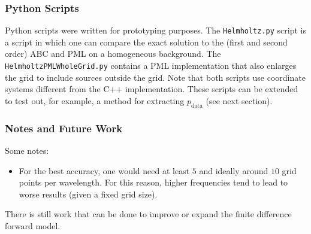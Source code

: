 \documentclass[10pt,a4paper]{article}
\begin{document}
\subsubsection{Python Scripts}
Python scripts were written for prototyping purposes. The \texttt{Helmholtz.py} script is a script in which one can compare the exact solution to the (first and second order) ABC and PML on a homogeneous background. The \texttt{HelmholtzPMLWholeGrid.py} contains a PML implementation that also enlarges the grid to include sources outside the grid. Note that both scripts use coordinate systems different from the C++ implementation. These scripts can be extended to test out, for example, a method for extracting $p_{\text{data}}$ (see next section). 

\subsubsection{Notes and Future Work}
Some notes:

\begin{itemize}
	\item For the best accuracy, one would need at least $5$ and ideally around $10$ grid points per wavelength. For this reason, higher frequencies tend to lead to worse results (given a fixed grid size).
\end{itemize}

There is still work that can be done to improve or expand the finite difference forward model. 
\end{document}
